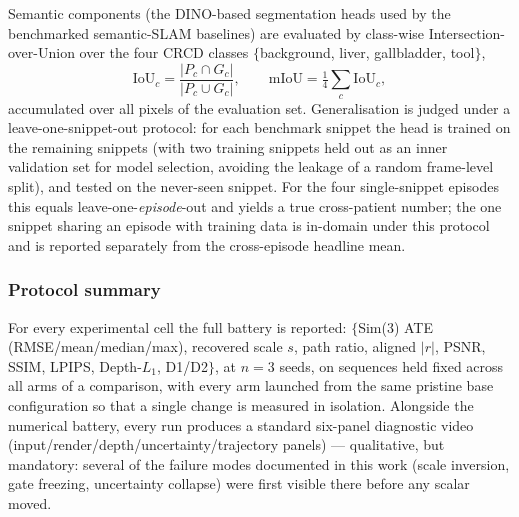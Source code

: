 Semantic components (the DINO-based segmentation heads used by the
benchmarked semantic-SLAM baselines) are evaluated by class-wise
Intersection-over-Union over the four CRCD classes
$\{$background, liver, gallbladder, tool$\}$,
\begin{equation}
  \mathrm{IoU}_c = \frac{|P_c \cap G_c|}{|P_c \cup G_c|},
  \qquad
  \mathrm{mIoU} = \tfrac{1}{4} \textstyle\sum_c \mathrm{IoU}_c ,
\end{equation}
accumulated over all pixels of the evaluation set. Generalisation is judged
under a leave-one-snippet-out protocol: for each benchmark snippet the head is
trained on the remaining snippets (with two training snippets held out as an
inner validation set for model selection, avoiding the leakage of a random
frame-level split), and tested on the never-seen snippet. For the four
single-snippet episodes this equals leave-one-\emph{episode}-out and yields a
true cross-patient number; the one snippet sharing an episode with training data
is in-domain under this protocol and is reported separately from the
cross-episode headline mean.

\subsubsection{Protocol summary}
\label{sec:eval_protocol}

For every experimental cell the full battery is reported:
$\{$Sim(3) ATE (RMSE/mean/median/max), recovered scale $s$, path ratio,
aligned $|r|$, PSNR, SSIM, LPIPS, Depth-$L_1$, D1/D2$\}$, at $n{=}3$ seeds, on
sequences held fixed across all arms of a comparison, with every arm launched
from the same pristine base configuration so that a single change is measured in
isolation. Alongside the numerical battery, every run produces a standard
six-panel diagnostic video (input/render/depth/uncertainty/trajectory panels)
--- qualitative, but mandatory: several of the failure modes documented in this
work (scale inversion, gate freezing, uncertainty collapse) were first visible
there before any scalar moved.
